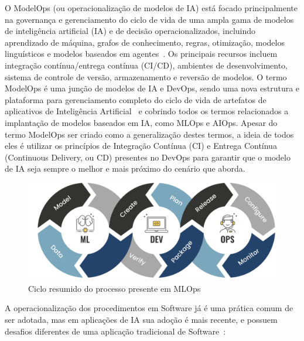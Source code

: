 \documentclass[portugues]{ic-tese}
\begin{document}
O ModelOps (ou operacionalização de modelos de IA) está focado principalmente na governança e gerenciamento do ciclo de vida de uma ampla gama de modelos de inteligência artificial (IA) e de decisão operacionalizados, incluindo aprendizado de máquina, grafos de conhecimento, regras, otimização, modelos linguísticos e modelos baseados em agentes~\cite{Gartner_2022}. Os principais recursos incluem integração contínua/entrega contínua (CI/CD), ambientes de desenvolvimento, sistema de controle de versão, armazenamento e reversão de modelos. O termo ModelOps é uma junção de modelos de IA e DevOps, sendo uma nova estrutura e plataforma para gerenciamento completo do ciclo de vida de artefatos de aplicativos de Inteligência Artificial~\cite{Hummer_2019} e cobrindo todos os termos relacionados a implantação de modelos baseados em IA, como MLOps e AIOps. Apesar do termo ModelOps ser criado como a generalização destes termos, a ideia de todos eles é utilizar os princípios de Integração Contínua (CI) e Entrega Contínua (Continuous Delivery, ou CD) presentes no DevOps para garantir que o modelo de IA seja sempre o melhor e mais próximo do cenário que aborda.

\begin{figure}[H]
\centering
\includegraphics[scale=0.7]{images/code-validate-deploy-loop.png}
\caption {Ciclo resumido do processo presente em MLOps}
\label{fig:MLOpsLoop}
\end{figure}

A operacionalização dos procedimentos em Software já é uma prática comum de ser adotada, mas em aplicações de IA sua adoção é mais recente, e possuem desafios diferentes de uma aplicação tradicional de Software~\cite{Sculley_2015}:
\end{document}
